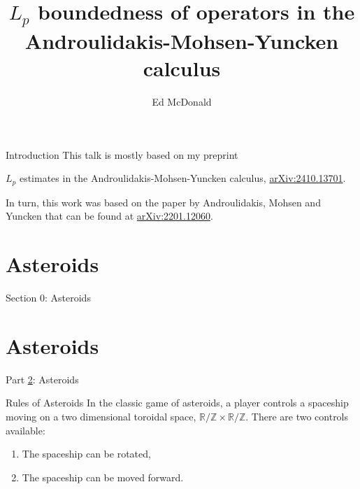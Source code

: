 \documentclass{beamer}
\newcommand\makebeamertitle{\frame{\maketitle}}%
\numberwithin{equation}{section}
\theoremstyle{plain}
\theoremstyle{plain}
\theoremstyle{definition}
\theoremstyle{plain}
\theoremstyle{plain}
\theoremstyle{definition}
\newcommand{\Rl}{\mathbb{R}}
\newcommand{\Itgr}{\mathbb{Z}}
\begin{document}
\title[$L_p$ estimates in the AMY calculus]{$L_p$ boundedness of operators in the Androulidakis-Mohsen-Yuncken calculus}


\author[E. McDonald]{Ed McDonald}



\makebeamertitle

\begin{frame}{Introduction}
  This talk is mostly based on my preprint
  \begin{center}
    $L_p$ estimates in the Androulidakis-Mohsen-Yuncken calculus, \href{https://arxiv.org/abs/2410.13701}{arXiv:2410.13701}.
  \end{center}
  In turn, this work was based on the paper by Androulidakis, Mohsen and Yuncken that can be found at \href{https://arxiv.org/abs/2201.12060v2}{arXiv:2201.12060}.
\end{frame}

\section{Asteroids}

\begin{frame}
  \huge{Section 0: Asteroids}
\end{frame}


\section{Asteroids}\label{asteroids_section}
\begin{frame}
  \Huge{Part \ref{asteroids_section}: Asteroids}
\end{frame}

\begin{frame}{Rules of Asteroids}
  In the classic game of asteroids, a player controls a spaceship moving on a two dimensional toroidal space, $\Rl/\Itgr\times \Rl/\Itgr.$ There are two controls available:
  \begin{enumerate}[{\rm (i)}]
    \item{} The spaceship can be rotated,
    \item{} The spaceship can be moved forward.
  \end{enumerate}
\end{frame}
\end{document}
